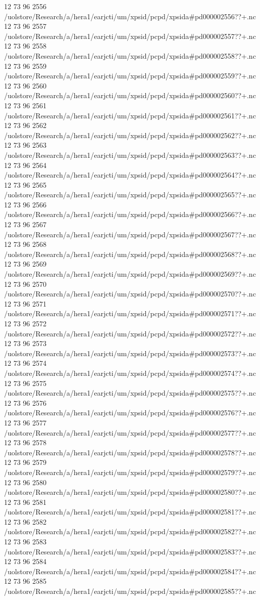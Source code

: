 12 73 96
2556
/uolstore/Research/a/hera1/earjcti/um/xpsid/pcpd/xpsida#pd000002556??+.nc
12 73 96
2557
/uolstore/Research/a/hera1/earjcti/um/xpsid/pcpd/xpsida#pd000002557??+.nc
12 73 96
2558
/uolstore/Research/a/hera1/earjcti/um/xpsid/pcpd/xpsida#pd000002558??+.nc
12 73 96
2559
/uolstore/Research/a/hera1/earjcti/um/xpsid/pcpd/xpsida#pd000002559??+.nc
12 73 96
2560
/uolstore/Research/a/hera1/earjcti/um/xpsid/pcpd/xpsida#pd000002560??+.nc
12 73 96
2561
/uolstore/Research/a/hera1/earjcti/um/xpsid/pcpd/xpsida#pd000002561??+.nc
12 73 96
2562
/uolstore/Research/a/hera1/earjcti/um/xpsid/pcpd/xpsida#pd000002562??+.nc
12 73 96
2563
/uolstore/Research/a/hera1/earjcti/um/xpsid/pcpd/xpsida#pd000002563??+.nc
12 73 96
2564
/uolstore/Research/a/hera1/earjcti/um/xpsid/pcpd/xpsida#pd000002564??+.nc
12 73 96
2565
/uolstore/Research/a/hera1/earjcti/um/xpsid/pcpd/xpsida#pd000002565??+.nc
12 73 96
2566
/uolstore/Research/a/hera1/earjcti/um/xpsid/pcpd/xpsida#pd000002566??+.nc
12 73 96
2567
/uolstore/Research/a/hera1/earjcti/um/xpsid/pcpd/xpsida#pd000002567??+.nc
12 73 96
2568
/uolstore/Research/a/hera1/earjcti/um/xpsid/pcpd/xpsida#pd000002568??+.nc
12 73 96
2569
/uolstore/Research/a/hera1/earjcti/um/xpsid/pcpd/xpsida#pd000002569??+.nc
12 73 96
2570
/uolstore/Research/a/hera1/earjcti/um/xpsid/pcpd/xpsida#pd000002570??+.nc
12 73 96
2571
/uolstore/Research/a/hera1/earjcti/um/xpsid/pcpd/xpsida#pd000002571??+.nc
12 73 96
2572
/uolstore/Research/a/hera1/earjcti/um/xpsid/pcpd/xpsida#pd000002572??+.nc
12 73 96
2573
/uolstore/Research/a/hera1/earjcti/um/xpsid/pcpd/xpsida#pd000002573??+.nc
12 73 96
2574
/uolstore/Research/a/hera1/earjcti/um/xpsid/pcpd/xpsida#pd000002574??+.nc
12 73 96
2575
/uolstore/Research/a/hera1/earjcti/um/xpsid/pcpd/xpsida#pd000002575??+.nc
12 73 96
2576
/uolstore/Research/a/hera1/earjcti/um/xpsid/pcpd/xpsida#pd000002576??+.nc
12 73 96
2577
/uolstore/Research/a/hera1/earjcti/um/xpsid/pcpd/xpsida#pd000002577??+.nc
12 73 96
2578
/uolstore/Research/a/hera1/earjcti/um/xpsid/pcpd/xpsida#pd000002578??+.nc
12 73 96
2579
/uolstore/Research/a/hera1/earjcti/um/xpsid/pcpd/xpsida#pd000002579??+.nc
12 73 96
2580
/uolstore/Research/a/hera1/earjcti/um/xpsid/pcpd/xpsida#pd000002580??+.nc
12 73 96
2581
/uolstore/Research/a/hera1/earjcti/um/xpsid/pcpd/xpsida#pd000002581??+.nc
12 73 96
2582
/uolstore/Research/a/hera1/earjcti/um/xpsid/pcpd/xpsida#pd000002582??+.nc
12 73 96
2583
/uolstore/Research/a/hera1/earjcti/um/xpsid/pcpd/xpsida#pd000002583??+.nc
12 73 96
2584
/uolstore/Research/a/hera1/earjcti/um/xpsid/pcpd/xpsida#pd000002584??+.nc
12 73 96
2585
/uolstore/Research/a/hera1/earjcti/um/xpsid/pcpd/xpsida#pd000002585??+.nc
